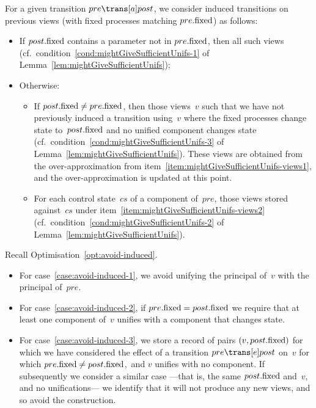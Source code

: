 For a given transition $pre \trans[a] post$, we consider induced transitions
on previous views (with fixed processes matching $pre.\mathrm{fixed}$) as follows:
%
\begin{itemize}
\item If $post.\mathrm{fixed}$ contains a parameter not in $pre.\mathrm{fixed}$, then all such
  views (cf.~condition~\ref{cond:mightGiveSufficientUnifs-1} of
  Lemma~\ref{lem:mightGiveSufficientUnifs});

\item Otherwise:
  \begin{itemize}
  \item If $post.\mathrm{fixed} \ne pre.\mathrm{fixed}$, then those views~$v$ such that we
    have not previously induced a transition using~$v$ where the fixed
    processes change state to~$post.\mathrm{fixed}$ and no unified component changes
    state (cf.~condition~\ref{cond:mightGiveSufficientUnifs-3} of
    Lemma~\ref{lem:mightGiveSufficientUnifs}).  These views are obtained from
    the over-approximation from
    item~\ref{item:mightGiveSufficientUnifs-views1}, and the
    over-approximation is updated at this point.

  \item For each control state~$cs$ of a component of~$pre$, those views
    stored against~$cs$ under item~\ref{item:mightGiveSufficientUnifs-views2}
    (cf.~condition~\ref{cond:mightGiveSufficientUnifs-2} of
    Lemma~\ref{lem:mightGiveSufficientUnifs}).
  \end{itemize}
\end{itemize}





\begin{opt}
Recall Optimisation~\ref{opt:avoid-induced}.  
\begin{itemize}
\item For case~\ref{case:avoid-induced-1}, we avoid unifying the principal
  of~$v$ with the principal of~$pre$.

\item For case~\ref{case:avoid-induced-2}, if $pre.\mathrm{fixed} = post.\mathrm{fixed}$ we
  require that at least one component of~$v$ unifies with a component that
  changes state.

\item For case~\ref{case:avoid-induced-3}, we store a record of pairs
  $(v, post.\mathrm{fixed})$ for which we have considered the effect of a transition
  $pre \trans[e] post$ on~$v$ for which $pre.\mathrm{fixed} \ne post.\mathrm{fixed}$,\,
  and $v$
  unifies with no component.
%
  If subsequently we consider a similar case ---that is, the same
  $post.\mathrm{fixed}$ and~$v$, and no unifications--- we identify that it will not
  produce any new views, and so avoid the construction.
\end{itemize}
\end{opt}



